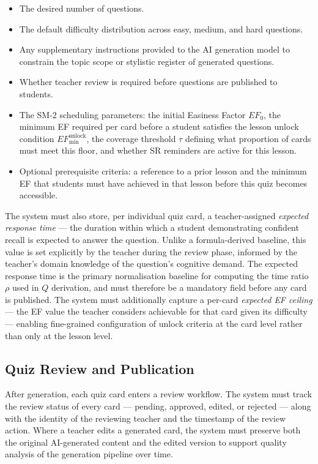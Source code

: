 \begin{itemize}
    \item The desired number of questions.
    \item The default difficulty distribution across easy, medium, and 
    hard questions.
    \item Any supplementary instructions provided to the AI generation 
    model to constrain the topic scope or stylistic register of 
    generated questions.
    \item Whether teacher review is required before questions are 
    published to students.
    \item The SM-2 scheduling parameters: the initial Easiness Factor 
    $EF_0$, the minimum EF required per card before a student satisfies 
    the lesson unlock condition $EF_{\min}^{\text{unlock}}$, the 
    coverage threshold $\tau$ defining what proportion of cards must 
    meet this floor, and whether SR reminders are active 
    for this lesson.
    \item Optional prerequisite criteria: a reference to a prior lesson 
    and the minimum EF that students must have achieved in that lesson 
    before this quiz becomes accessible.
\end{itemize}

The system must also store, per individual quiz card, a 
teacher-assigned \textit{expected response time} — the duration within 
which a student demonstrating confident recall is expected to answer 
the question. Unlike a formula-derived baseline, this value is set 
explicitly by the teacher during the review phase, informed by the 
teacher's domain knowledge of the question's cognitive demand. The 
expected response time is the primary normalisation baseline for 
computing the time ratio $\rho$ used in $Q$ derivation, and must 
therefore be a mandatory field before any card is published. The 
system must additionally capture a per-card \textit{expected EF 
ceiling} — the EF value the teacher considers achievable for that 
card given its difficulty — enabling fine-grained configuration of 
unlock criteria at the card level rather than only at the lesson level.

\subsection{Quiz Review and Publication}
After generation, each quiz card enters a review workflow. The system 
must track the review status of every card — pending, approved, edited, 
or rejected — along with the identity of the reviewing teacher and the 
timestamp of the review action. Where a teacher edits a generated 
card, the system must preserve both the original AI-generated content 
and the edited version to support quality analysis of the generation 
pipeline over time.

